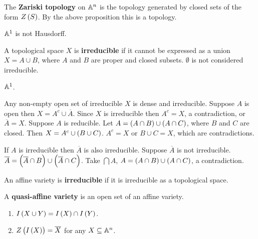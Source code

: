 \begin{definition}
The \textbf{Zariski topology} on $ \AA^n $ is the topology generated by closed sets of the form $ Z\br{S} $. By the above proposition this is a topology.
\end{definition}

\begin{example}
$ \AA^1 $ is not Hausdorff.
\end{example}

\begin{definition}
A topological space $ X $ is \textbf{irreducible} if it cannot be expressed as a union $ X = A \cup B $, where $ A $ and $ B $ are proper and closed subsets. $ \emptyset $ is not considered irreducible.
\end{definition}

\begin{example}
$ \AA^1 $.
\end{example}

\begin{example}
Any non-empty open set of irreducible $ X $ is dense and irreducible. Suppose $ A $ is open then $ X = A^c \cup \overline{A} $. Since $ X $ is irreducible then $ A^c = X $, a contradiction, or $ \overline{A} = X $. Suppose $ A $ is reducible. Let $ A = \br{A \cap B} \cup \br{A \cap C} $, where $ B $ and $ C $ are closed. Then $ X = A^c \cup \br{B \cup C} $. $ A^c = X $ or $ B \cup C = X $, which are contradictions.
\end{example}

\begin{example}
If $ A $ is irreducible then $ \overline{A} $ is also irreducible. Suppose $ \overline{A} $ is not irreducible. $ \overline{A} = \br{\overline{A} \cap B} \cup \br{\overline{A} \cap C} $. Take $ \bigcap A $, $ A = \br{A \cap B} \cup \br{A \cap C} $, a contradiction.
\end{example}

\begin{definition}
An affine variety is \textbf{irreducible} if it is irreducible as a topological space.
\end{definition}

\begin{remark}
A \textbf{quasi-affine variety} is an open set of an affine variety.
\end{remark}

\pagebreak

\begin{proposition}
\hfill
\begin{enumerate}
\item $ I\br{X \cup Y} = I\br{X} \cap I\br{Y} $.
\item $ Z\br{I\br{X}} = \overline{X} $ for any $ X \subseteq \AA^n $.
\end{enumerate}
\end{proposition}

